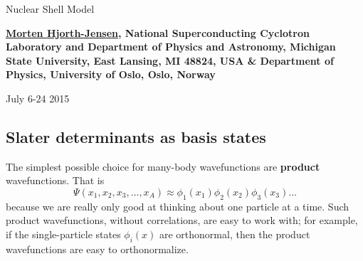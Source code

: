 \documentclass[%
twoside,                 %
final,                   %
10pt]{article}
\begin{document}






\thispagestyle{empty}

\begin{center}
{\LARGE\bf
\begin{spacing}{1.25}
Nuclear Shell Model
\end{spacing}
}
\end{center}


\begin{center}
{\bf \href{{http://computationalphysics.no}}{Morten Hjorth-Jensen}, National Superconducting Cyclotron Laboratory and Department of Physics and Astronomy, Michigan State University, East Lansing, MI 48824, USA {\&} Department of Physics, University of Oslo, Oslo, Norway${}^{}$} \\ [0mm]
\end{center}

    \begin{center}
\end{center}
    

\begin{center} %
July 6-24 2015
\end{center}

\vspace{1cm}


\tableofcontents


\vspace{1cm} %




\subsection*{Slater determinants as basis states}

The simplest possible choice for many-body wavefunctions are \textbf{product} wavefunctions.
That is
\[ 
\Psi(x_1, x_2, x_3, \ldots, x_A) \approx \phi_1(x_1) \phi_2(x_2) \phi_3(x_3) \ldots
\]
because we are really only good  at thinking about one particle at a time. Such 
product wavefunctions, without correlations, are easy to 
work with; for example, if the single-particle states $\phi_i(x)$ are orthonormal, then 
the product wavefunctions are easy to orthonormalize.   
\end{document}
